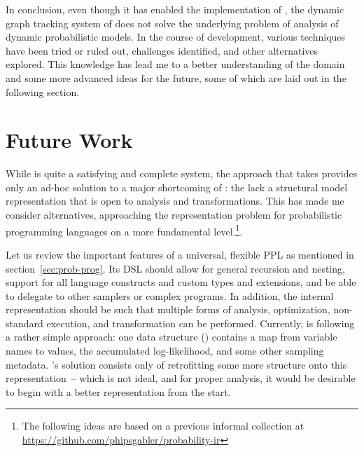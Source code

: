 In conclusion, even though it has enabled the implementation of \autogibbsjl{}, the dynamic graph
tracking system of \irtrackerjl{} does not solve the underlying problem of analysis of dynamic
probabilistic models.  In the course of development, various techniques have been tried or ruled
out, challenges identified, and other alternatives explored.  This knowledge has lead me to a better
understanding of the domain and some more advanced ideas for the future, some of which are laid out
in the following section.


\section{Future Work}
\label{sec:future-work}

While \irtrackerjl{} is quite a satisfying and complete system, the approach that \autogibbsjl{}
takes provides only an ad-hoc solution to a major shortcoming of \turingjl{}: the lack a structural
model representation that is open to analysis and transformations.  This has made me consider
alternatives, approaching the representation problem for probabilistic programming languages on a
more fundamental level.\footnote{The following ideas are based on a previous informal collection at
  \protect\url{https://github.com/phipsgabler/probability-ir}}.

Let us review the important features of a universal, flexible PPL as mentioned in
section~\ref{sec:prob-prog}.  Its DSL should allow for general recursion and nesting, support for
all language constructs and custom types and extensions, and be able to delegate to other samplers
or complex programs.  In addition, the internal representation should be such that multiple forms of
analysis, optimization, non-standard execution, and transformation can be performed.  Currently,
\turingjl{} is following a rather simple approach: one data structure () contains a
map from variable names to values, the accumulated log-likelihood, and some other sampling metadata.
\autogibbsjl{}'s solution consists only of retrofitting some more structure onto this
representation~-- which is not ideal, and for proper analysis, it would be desirable to begin with a
better representation from the start.

